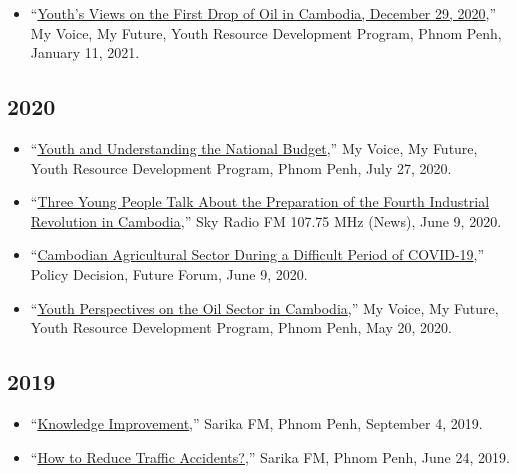 \documentclass[10pt,a4paper]{article}
\begin{document}
\begin{adjustwidth}{.7cm}{}
\begin{itemize}[label={},itemindent=-2em,leftmargin=2em]
		\item ``\href{https://www.facebook.com/yrdpcambodiapage/videos/436980507352194}{Youth's Views on the First Drop of Oil in Cambodia, December 29, 2020},” My Voice, My Future, Youth Resource Development Program, Phnom Penh, January 11, 2021. 
		
	\end{itemize}
	
			
	\subsection*{2020}
		\begin{itemize}[label={},itemindent=-2em,leftmargin=2em]
			\item “\href{https://www.facebook.com/yrdpcambodiapage/videos/3137988382950681}{Youth and Understanding the National Budget},” My Voice, My Future, Youth Resource Development Program, Phnom Penh, July 27, 2020.
		
			\item ``\href{https://www.skyradiokh.com/d/139214}{Three Young People Talk About the Preparation of the Fourth Industrial Revolution in Cambodia},” Sky Radio FM 107.75 MHz (News), June 9, 2020.
			
			\item ``\href{https://www.facebook.com/FutureForumAsia/videos/836714263404226}{Cambodian Agricultural Sector During a Difficult Period of COVID-19},” Policy Decision, Future Forum, June 9, 2020.
			
			\item ``\href{https://www.facebook.com/yrdpcambodiapage/videos/2875876895973356}{Youth Perspectives on the Oil Sector in Cambodia},” My Voice, My Future, Youth Resource Development Program, Phnom Penh, May 20, 2020. 
			
		\end{itemize}
		
	\subsection*{2019}
		\begin{itemize}[label={},itemindent=-2em,leftmargin=2em]
				
			\item “\href{https://www.facebook.com/SarikaFM/videos/681602885694436}{Knowledge Improvement},” Sarika FM, Phnom Penh, September 4, 2019. 
			
			\item “\href{https://www.facebook.com/SarikaFM/videos/352213152129788}{How to Reduce Traffic Accidents?},” Sarika FM, Phnom Penh, June 24, 2019. 
				

\end{itemize}
\end{adjustwidth}
\end{document}
